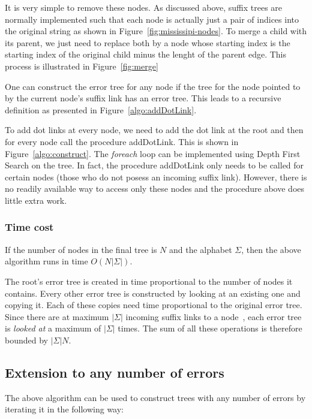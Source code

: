 It is very simple to remove these nodes. As discussed above, suffix trees are normally implemented such that each node is actually just a pair of indices into the original string as shown in Figure~\ref{fig:mississipi-nodes}. To merge a child with its parent, we just need to replace both by a node whose starting index is the starting index of the original child minus the lenght of the parent edge. This process is illustrated in Figure~\ref{fig:merge} 



One can construct the error tree for any node if the tree for the node pointed to by the current node's suffix link has an error tree. This leads to a recursive definition as presented in Figure~\ref{algo:addDotLink}. 



To add dot links at every node, we need to add the dot link at the root and then for every node call the procedure addDotLink. This is shown in Figure~\ref{algo:construct}. The \textit{foreach} loop can be implemented using Depth First Search on the tree. In fact, the procedure addDotLink only needs to be called for certain nodes (those who do not posess an incoming suffix link). However, there is no readily available way to access only these nodes and the procedure above does little extra work.

\subsubsection{Time cost}

If the number of nodes in the final tree is $N$ and the alphabet $\Sigma$, then the above algorithm runs in time $O(N|\Sigma|)$.

The root's error tree is created in time proportional to the number of nodes it contains. Every other error tree is constructed by looking at an existing one and copying it. Each of these copies need time proportional to the original error tree. Since there are at maximum $|\Sigma|$ incoming suffix links to a node~\cite{}, each error tree is \emph{looked at} a maximum of $|\Sigma|$ times. The sum of all these operations is therefore bounded by $|\Sigma|N$.

\subsection{Extension to any number of errors}

The above algorithm can be used to construct trees with any number of errors by iterating it in the following way:

